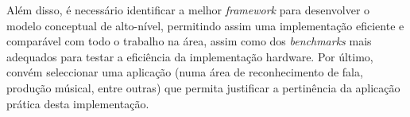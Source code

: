 \documentclass[a4paper, onecolumn, 10pt]{article}
\begin{document}
	Além disso, é necessário identificar a melhor \textit{framework} para desenvolver o modelo conceptual de alto-nível, permitindo assim uma implementação eficiente e comparável com todo o trabalho na área, assim como dos \textit{benchmarks} mais adequados para testar a eficiência da implementação hardware. Por último, convém seleccionar uma aplicação (numa área de reconhecimento de fala, produção músical, entre outras) que permita justificar a pertinência da aplicação prática desta implementação.

	\printbibliography
\end{document}
